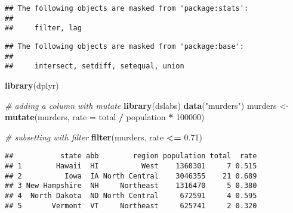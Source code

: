 \documentclass[]{article}
\newenvironment{Shaded}{\begin{snugshade}}{\end{snugshade}}
\newcommand{\CommentTok}[1]{\textcolor[rgb]{0.56,0.35,0.01}{\textit{#1}}}
\newcommand{\DataTypeTok}[1]{\textcolor[rgb]{0.13,0.29,0.53}{#1}}
\newcommand{\DecValTok}[1]{\textcolor[rgb]{0.00,0.00,0.81}{#1}}
\newcommand{\FloatTok}[1]{\textcolor[rgb]{0.00,0.00,0.81}{#1}}
\newcommand{\KeywordTok}[1]{\textcolor[rgb]{0.13,0.29,0.53}{\textbf{#1}}}
\newcommand{\NormalTok}[1]{#1}
\newcommand{\OperatorTok}[1]{\textcolor[rgb]{0.81,0.36,0.00}{\textbf{#1}}}
\newcommand{\StringTok}[1]{\textcolor[rgb]{0.31,0.60,0.02}{#1}}
\begin{document}
\begin{verbatim}
## The following objects are masked from 'package:stats':
## 
##     filter, lag
\end{verbatim}

\begin{verbatim}
## The following objects are masked from 'package:base':
## 
##     intersect, setdiff, setequal, union
\end{verbatim}

\begin{Shaded}
\begin{Highlighting}[]
\KeywordTok{library}\NormalTok{(dplyr)}

\CommentTok{# adding a column with mutate}
\KeywordTok{library}\NormalTok{(dslabs)}
\KeywordTok{data}\NormalTok{(}\StringTok{"murders"}\NormalTok{)}
\NormalTok{murders <-}\StringTok{ }\KeywordTok{mutate}\NormalTok{(murders, }\DataTypeTok{rate =}\NormalTok{ total }\OperatorTok{/}\StringTok{ }\NormalTok{population }\OperatorTok{*}\StringTok{ }\DecValTok{100000}\NormalTok{)}

\CommentTok{# subsetting with filter}
\KeywordTok{filter}\NormalTok{(murders, rate }\OperatorTok{<=}\StringTok{ }\FloatTok{0.71}\NormalTok{)}
\end{Highlighting}
\end{Shaded}

\begin{verbatim}
##           state abb        region population total  rate
## 1        Hawaii  HI          West    1360301     7 0.515
## 2          Iowa  IA North Central    3046355    21 0.689
## 3 New Hampshire  NH     Northeast    1316470     5 0.380
## 4  North Dakota  ND North Central     672591     4 0.595
## 5       Vermont  VT     Northeast     625741     2 0.320
\end{verbatim}

\begin{Shaded}
\end{Shaded}
\end{document}
